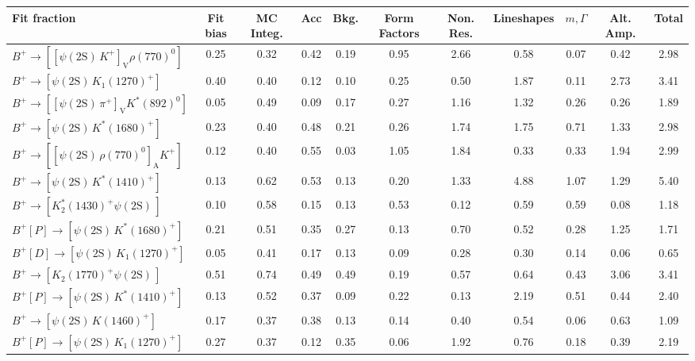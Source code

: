 \begin{tabular}{l  c  c  c  c  c  c  c  c  c  | c }
\hline
\hline
Fit fraction & Fit bias & MC Integ. & Acc & Bkg. & Form Factors & Non. Res. & Lineshapes & $m,\Gamma$ & Alt. Amp. &  Total  \\ 
\hline
$B^{+}\rightarrow \left[\left[\psi(\text{2S})\,K^{+}\right]_{\text{V}}\rho(770)^{0}\right]$ & 0.25 & 0.32 & 0.42 & 0.19 & 0.95 & 2.66 & 0.58 & 0.07 & 0.42 & 2.98 \\ 
$B^{+}\rightarrow \left[\psi(\text{2S})\,K_{1}(1270)^{+}\right]$ & 0.40 & 0.40 & 0.12 & 0.10 & 0.25 & 0.50 & 1.87 & 0.11 & 2.73 & 3.41 \\ 
$B^{+}\rightarrow \left[\left[\psi(\text{2S})\,\pi^{+}\right]_{\text{V}}K^{*}(892)^{0}\right]$ & 0.05 & 0.49 & 0.09 & 0.17 & 0.27 & 1.16 & 1.32 & 0.26 & 0.26 & 1.89 \\ 
$B^{+}\rightarrow \left[\psi(\text{2S})\,K^{*}(1680)^{+}\right]$ & 0.23 & 0.40 & 0.48 & 0.21 & 0.26 & 1.74 & 1.75 & 0.71 & 1.33 & 2.98 \\ 
$B^{+}\rightarrow \left[\left[\psi(\text{2S})\,\rho(770)^{0}\right]_{\text{A}}K^{+}\right]$ & 0.12 & 0.40 & 0.55 & 0.03 & 1.05 & 1.84 & 0.33 & 0.33 & 1.94 & 2.99 \\ 
$B^{+}\rightarrow \left[\psi(\text{2S})\,K^{*}(1410)^{+}\right]$ & 0.13 & 0.62 & 0.53 & 0.13 & 0.20 & 1.33 & 4.88 & 1.07 & 1.29 & 5.40 \\ 
$B^{+}\rightarrow \left[K_{2}^{*}(1430)^{+}\psi(\text{2S})\,\right]$ & 0.10 & 0.58 & 0.15 & 0.13 & 0.53 & 0.12 & 0.59 & 0.59 & 0.08 & 1.18 \\ 
$B^{+}\left[P\right]\rightarrow \left[\psi(\text{2S})\,K^{*}(1680)^{+}\right]$ & 0.21 & 0.51 & 0.35 & 0.27 & 0.13 & 0.70 & 0.52 & 0.28 & 1.25 & 1.71 \\ 
$B^{+}\left[D\right]\rightarrow \left[\psi(\text{2S})\,K_{1}(1270)^{+}\right]$ & 0.05 & 0.41 & 0.17 & 0.13 & 0.09 & 0.28 & 0.30 & 0.14 & 0.06 & 0.65 \\ 
$B^{+}\rightarrow \left[K_{2}(1770)^{+}\psi(\text{2S})\,\right]$ & 0.51 & 0.74 & 0.49 & 0.49 & 0.19 & 0.57 & 0.64 & 0.43 & 3.06 & 3.41 \\ 
$B^{+}\left[P\right]\rightarrow \left[\psi(\text{2S})\,K^{*}(1410)^{+}\right]$ & 0.13 & 0.52 & 0.37 & 0.09 & 0.22 & 0.13 & 2.19 & 0.51 & 0.44 & 2.40 \\ 
$B^{+}\rightarrow \left[\psi(\text{2S})\,K(1460)^{+}\right]$ & 0.17 & 0.37 & 0.38 & 0.13 & 0.14 & 0.40 & 0.54 & 0.06 & 0.63 & 1.09 \\ 
$B^{+}\left[P\right]\rightarrow \left[\psi(\text{2S})\,K_{1}(1270)^{+}\right]$ & 0.27 & 0.37 & 0.12 & 0.35 & 0.06 & 1.92 & 0.76 & 0.18 & 0.39 & 2.19 \\ 

\end{tabular}
